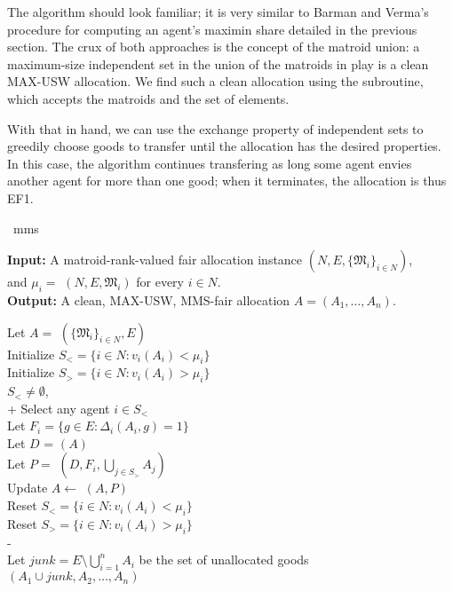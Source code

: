 The algorithm should look familiar; it is very similar to Barman and Verma's procedure for computing an agent's maximin share detailed in the previous section. The crux of both approaches is the concept of the matroid union: a maximum-size independent set in the union of the matroids in play is a clean MAX-USW allocation. We find such a clean allocation using the  subroutine, which accepts the matroids and the set of elements.

With that in hand, we can use the exchange property of independent sets to greedily choose goods to transfer until the allocation has the desired properties. In this case, the algorithm continues transfering as long some agent envies another agent for more than one good; when it terminates, the allocation is thus EF1.

\begin{algorithm}{~\cite{barman2021existence}}{mms}

\textbf{Input:}  \tab A matroid-rank-valued fair allocation instance $(N, E, \{\mathfrak{M}_i\}_{i\in N})$, \\
\mbox{}\tab and $\mu_i =$ $(N, E, \mathfrak{M}_i)$ for every $i\in N$.\\
\textbf{Output:} \tab A clean, MAX-USW, MMS-fair allocation $A = (A_1,\dots,A_n)$.

\begin{pseudo}[label=\small\arabic*, indent-mark]
Let $A =$ $(\{\mathfrak{M}_i\}_{i\in N}, E)$  \\
Initialize $S_< = \{ i\in N : v_i(A_i) < \mu_i \}$ \\
Initialize $S_> = \{ i\in N : v_i(A_i) > \mu_i \}$ \\
 $S_<\neq\emptyset$,   \\+
    Select any agent $i \in S_<$\\
    Let $F_i = \{ g\in E : \Delta_i(A_i, g) = 1 \}$ \\
    Let $D$ = $(A)$ \\
    Let $P =$ $(D, F_i, \bigcup_{j\in S_>}A_j)$ \\
    Update $A \leftarrow$ $(A,P)$ \\
    Reset $S_< = \{ i\in N : v_i(A_i) < \mu_i \}$ \\
    Reset $S_> = \{ i\in N : v_i(A_i) > \mu_i \}$ \\-
 \\
Let $junk = E \setminus \bigcup_{i=1}^n A_i$ be the set of unallocated goods \\
 $(A_1 \cup junk, A_2,\dots,A_n)$
\end{pseudo}
  
\end{algorithm}

